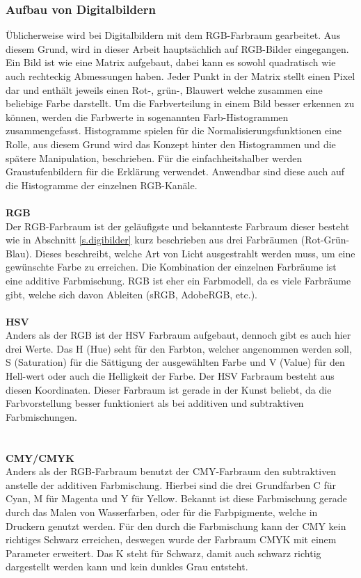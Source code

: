 \documentclass[a4paper,12pt,oneside]{article}
\begin{document}
\subsubsection{Aufbau von Digitalbildern}\label{s.aufbdigibilder}
  Üblicherweise wird bei Digitalbildern mit dem RGB-Farbraum gearbeitet. Aus diesem Grund, wird in dieser Arbeit hauptsächlich auf RGB-Bilder eingegangen. Ein Bild ist wie eine Matrix aufgebaut, dabei kann es sowohl quadratisch wie auch rechteckig Abmessungen haben. Jeder Punkt in der Matrix stellt einen Pixel dar und enthält jeweils einen Rot-, grün-, Blauwert welche zusammen eine beliebige Farbe darstellt. Um die Farbverteilung in einem Bild besser erkennen zu können, werden die Farbwerte in sogenannten Farb-Histogrammen zusammengefasst. Histogramme spielen für die Normalisierungsfunktionen eine Rolle, aus diesem Grund wird das Konzept hinter den Histogrammen und die spätere Manipulation, beschrieben. Für die einfachheitshalber werden Graustufenbildern für die Erklärung verwendet. Anwendbar sind diese auch auf die Histogramme der einzelnen RGB-Kanäle.\\\\
 \textbf{RGB}\label{s.rgb}\\
  Der RGB-Farbraum ist der geläufigste und bekannteste Farbraum dieser besteht wie in Abschnitt \ref{s.digibilder} kurz beschrieben aus drei Farbräumen (Rot-Grün-Blau). Dieses beschreibt, welche Art von Licht ausgestrahlt werden muss, um eine gewünschte Farbe zu erreichen. Die Kombination der einzelnen Farbräume ist eine additive Farbmischung. RGB ist eher ein Farbmodell, da es viele Farbräume gibt, welche sich davon Ableiten (sRGB, AdobeRGB, etc.).\\\\
  \textbf{HSV}\label{s.hsv}\\
  Anders als der RGB ist der HSV Farbraum aufgebaut, dennoch gibt es auch hier drei Werte. Das H (Hue) seht für den Farbton, welcher angenommen werden soll, S (Saturation) für die Sättigung der ausgewählten Farbe und V (Value) für den Hell-wert oder auch die Helligkeit der Farbe. Der HSV Farbraum besteht aus diesen Koordinaten. Dieser Farbraum ist gerade in der Kunst beliebt, da die Farbvorstellung besser funktioniert als bei additiven und subtraktiven Farbmischungen.\\\\\\
  \textbf{CMY/CMYK}\label{s.cmy}\\
  Anders als der RGB-Farbraum benutzt der CMY-Farbraum den subtraktiven anstelle der additiven Farbmischung. Hierbei sind die drei Grundfarben C für Cyan, M für Magenta und Y für Yellow. Bekannt ist diese Farbmischung gerade durch das Malen von Wasserfarben, oder für die Farbpigmente, welche in Druckern genutzt werden. Für den durch die Farbmischung kann der CMY kein richtiges Schwarz erreichen, deswegen wurde der Farbraum CMYK mit einem Parameter erweitert. Das K steht für Schwarz, damit auch schwarz richtig dargestellt werden kann und kein dunkles Grau entsteht.\\\\
\end{document}
